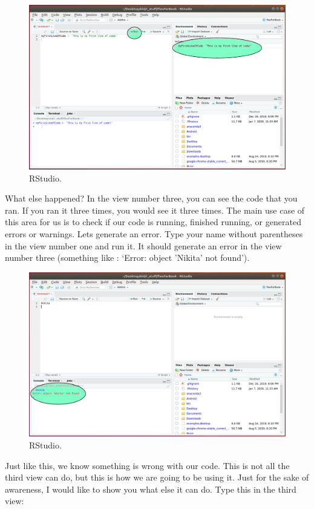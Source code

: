 \documentclass[]{book}
\begin{document}
\begin{figure}
\centering
\includegraphics{rstudio3.png}
\caption{RStudio.}
\end{figure}

What else happened? In the view number three, you can see the code that you ran. If you ran it three times, you would see it three times. The main use case of this area for us is to check if our code is running, finished running, or generated errors or warnings. Lets generate an error. Type your name without parentheses in the view number one and run it. It should generate an error in the view number three (something like : `Error: object 'Nikita' not found').

\begin{figure}
\centering
\includegraphics{rstudio4.png}
\caption{RStudio.}
\end{figure}

Just like this, we know something is wrong with our code. This is not all the third view can do, but this is how we are going to be using it. Just for the sake of awareness, I would like to show you what else it can do. Type this in the third view:
\end{document}
